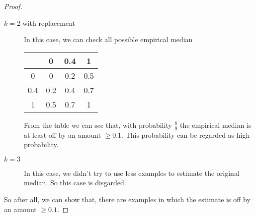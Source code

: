 \documentclass{article}
\begin{document}
\begin{enumerate}
\begin{proof}
\begin{description}
				\item[$k = 2$ with replacement] In this case, we can check all possible empirical median \begin{tabular}{|c|c|c|c|}
					\hline
					& 0 & 0.4 & 1 \\
					\hline
					0 & 0 & 0.2 & 0.5 \\
					\hline
					0.4 & 0.2 & 0.4 & 0.7 \\
					\hline
					1 & 0.5 & 0.7 & 1 \\
					\hline
				\end{tabular}
				From the table we can see that, with probability $\frac{8}{9}$ the empirical median is at least off by an amount $\geq 0.1$. This probability can be regarded as high probability.
				\item[$k = 3$] In this case, we didn't try to use less examples to estimate the original median. So this case is disgarded.
				\end{description}
				So after all, we can show that, there are examples in which the estimate is off by an amount $\geq 0.1$.
			\end{proof}
		\end{enumerate}
\end{document}
